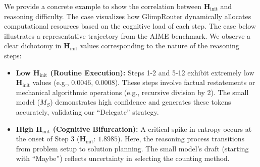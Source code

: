 \documentclass[11pt]{article}
\newcommand{\approach}{{GlimpRouter}\xspace}
\begin{document}
We provide a concrete example to show the correlation between $\mathbf{H}_\text{init}$ and reasoning difficulty. The case visualizes how \approach dynamically allocates computational resources based on the cognitive load of each step.
The case below illustrates a representative trajectory from the AIME benchmark. We observe a clear dichotomy in $\mathbf{H}_\text{init}$ values corresponding to the nature of the reasoning steps:
\begin{itemize}
    \item \textbf{Low $\mathbf{H}_\text{init}$ (Routine Execution):} Steps 1-2 and 5-12 exhibit extremely low $\mathbf{H}_\text{init}$ values (e.g., $0.0046$, $0.0008$). These steps involve factual restatements or mechanical algorithmic operations (e.g., recursive division by 2). The small model ($M_S$) demonstrates high confidence and generates these tokens accurately, validating our ``Delegate'' strategy.
    \item \textbf{High $\mathbf{H}_\text{init}$ (Cognitive Bifurcation):} A critical spike in entropy occurs at the onset of Step 3 ($\mathbf{H}_\text{init}$: $1.8985$). Here, the reasoning process transitions from problem setup to solution planning. The small model's draft (starting with ``Maybe'') reflects uncertainty in selecting the counting method. 
\end{itemize}
\end{document}
